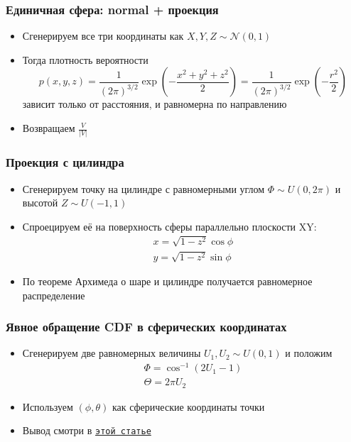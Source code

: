 \documentclass[handout,10pt]{beamer}
\begin{document}
\begin{frame}[fragile]
\frametitle{Единичная сфера: normal + проекция}
\begin{itemize}
\item Сгенерируем все три координаты как \begin{math}X,Y,Z\sim \mathcal N(0,1)\end{math}
\pause
\item Тогда плотность вероятности \begin{equation*}p(x,y,z)=\frac{1}{(2\pi)^{3/2}}\exp\left(-\frac{x^2+y^2+z^2}{2}\right)=\frac{1}{(2\pi)^{3/2}}\exp\left(-\frac{r^2}{2}\right)\end{equation*} зависит только от расстояния, и равномерна по направлению
\pause
\item Возвращаем \begin{math}\frac{V}{|V|}\end{math}
\end{itemize}
\end{frame}

\begin{frame}[fragile]
\frametitle{Проекция с цилиндра}
\begin{itemize}
\item Сгенерируем точку на цилиндре с равномерными углом \begin{math}\Phi \sim U(0,2\pi)\end{math} и высотой \begin{math}Z\sim U(-1,1)\end{math}
\pause
\item Спроецируем её на поверхность сферы параллельно плоскости XY:
\begin{gather*}
x = \sqrt{1-z^2}\cos\phi \\
y = \sqrt{1-z^2}\sin\phi
\end{gather*}
\pause
\item По теореме Архимеда о шаре и цилиндре получается равномерное распределение
\end{itemize}
\end{frame}

\begin{frame}[fragile]
\frametitle{Явное обращение CDF в сферических координатах}
\begin{itemize}
\item Сгенерируем две равномерных величины \begin{math}U_1,U_2\sim U(0,1)\end{math} и положим
\begin{gather*}
\Phi = \cos^{-1}(2U_1-1) \\
\Theta = 2\pi U_2
\end{gather*}
\pause
\item Используем \begin{math}(\phi,\theta)\end{math} как сферические координаты точки
\pause
\item Вывод смотри в \href{https://www.bogotobogo.com/Algorithms/uniform_distribution_sphere.php}{\texttt{этой статье}}
\end{itemize}
\end{frame}
\end{document}
